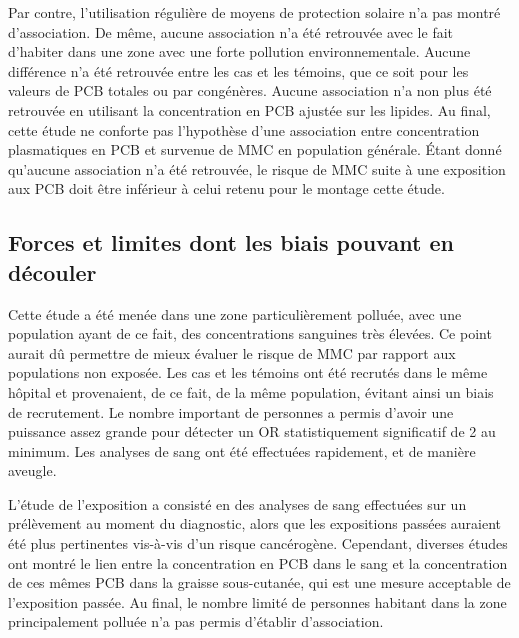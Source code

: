 \documentclass[10pt,english,french]{article}
\begin{document}
Par contre, l'utilisation régulière de moyens de protection solaire n'a pas montré d'association. De même, aucune association n'a été retrouvée avec le fait d'habiter dans une zone avec une forte pollution environnementale. Aucune différence n'a été retrouvée entre les cas et les témoins, que ce soit pour les valeurs de PCB totales ou par congénères. Aucune association n'a non plus été retrouvée en utilisant la concentration en PCB ajustée sur les lipides. Au final, cette étude ne conforte pas l'hypothèse d'une association entre concentration plasmatiques en PCB et survenue de MMC en population générale. \'{E}tant donné qu'aucune association n'a été retrouvée, le risque de MMC suite à une exposition aux PCB doit être inférieur à celui retenu pour le montage cette étude. 

\subsection{Forces et limites dont les biais pouvant en découler}
Cette étude a été menée dans une zone particulièrement polluée, avec une population ayant de ce fait, des concentrations sanguines très élevées. Ce point aurait dû permettre de mieux évaluer le risque de MMC par rapport aux populations non exposée. Les cas et les témoins ont été recrutés dans le même hôpital et provenaient, de ce fait, de la même population, évitant ainsi un biais de recrutement. Le nombre important de personnes a permis d'avoir une puissance assez grande pour détecter un OR statistiquement significatif de 2 au minimum. Les analyses de sang ont été effectuées rapidement, et de manière aveugle.
 
L'étude de l'exposition a consisté en des analyses de sang effectuées sur un prélèvement au moment du diagnostic, alors que les expositions passées auraient été plus pertinentes vis-à-vis d'un risque cancérogène. Cependant, diverses études ont montré le lien entre la concentration en PCB dans le sang et la concentration de ces mêmes PCB dans la graisse sous-cutanée, qui est une mesure acceptable de l'exposition passée. Au final, le nombre limité de personnes habitant dans la zone principalement polluée n'a pas permis d'établir d'association.
\end{document}

